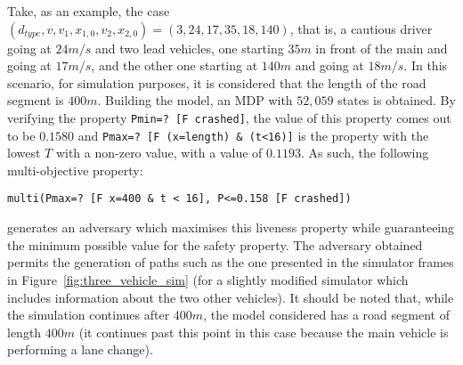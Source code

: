 Take, as an example, the case $(d_{type}, v, v_1, x_{1,0}, v_2, x_{2,0}) = (3, 24, 17, 35, 18, 140)$, that is, a cautious driver going at $24m/s$ and two lead vehicles, one starting $35m$ in front of the main and going at $17m/s$, and the other one starting at $140m$ and going at $18m/s$. In this scenario, for simulation purposes, it is considered that the length of the road segment is $400m$. Building the model, an MDP with $52,059$ states is obtained. By verifying the property \texttt{Pmin=? [F crashed]}, the value of this property comes out to be $0.1580$ and \texttt{Pmax=? [F (x=length) \& (t<16)]} is the property with the lowest $T$ with a non-zero value, with a value of $0.1193$. As such, the following multi-objective property:

\begin{minipage}{\linewidth}
{\vspace{1em}
\begin{lstlisting}
multi(Pmax=? [F x=400 & t < 16], P<=0.158 [F crashed])
\end{lstlisting}
}
\end{minipage}

generates an adversary which maximises this liveness property while guaranteeing the minimum possible value for the safety property. The adversary obtained permits the generation of paths such as the one presented in the simulator frames in Figure~\ref{fig:three_vehicle_sim} (for a slightly modified simulator which includes information about the two other vehicles). It should be noted that, while the simulation continues after $400m$, the model considered has a road segment of length $400m$ (it continues past this point in this case because the main vehicle is performing a lane change).

